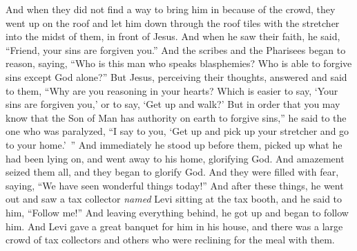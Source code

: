 \begin{biblechapter}
\verse And when they did not find a way to bring him in because of the crowd, they went up on the roof and let him down through the roof tiles with the stretcher into the midst of them, in front of Jesus.
\verse And when he saw their faith, he said, “Friend, your sins are forgiven you.”
\verse And the scribes and the Pharisees began to reason, saying, “Who is this man who speaks blasphemies? Who is able to forgive sins except God alone?”
\verse But Jesus, perceiving their thoughts, answered and said to them, “Why are you reasoning in your hearts?
\verse Which is easier to say, ‘Your sins are forgiven you,’ or to say, ‘Get up and walk?’
\verse But in order that you may know that the Son of Man has authority on earth to forgive sins,” he said to the one who was paralyzed, “I say to you, ‘Get up and pick up your stretcher and go to your home.’ ”
\verse And immediately he stood up before them, picked up what he had been lying on, and went away to his home, glorifying God.
\verse And amazement seized them all, and they began to glorify God. And they were filled with fear, saying, “We have seen wonderful things today!”
 And after these things, he went out and saw a tax collector \textit{named} Levi sitting at the tax booth, and he said to him, “Follow me!”
\verse And leaving everything behind, he got up and began to follow him.
\verse And Levi gave a great banquet for him in his house, and there was a large crowd of tax collectors and others who were reclining for the meal with them.

\end{biblechapter}
